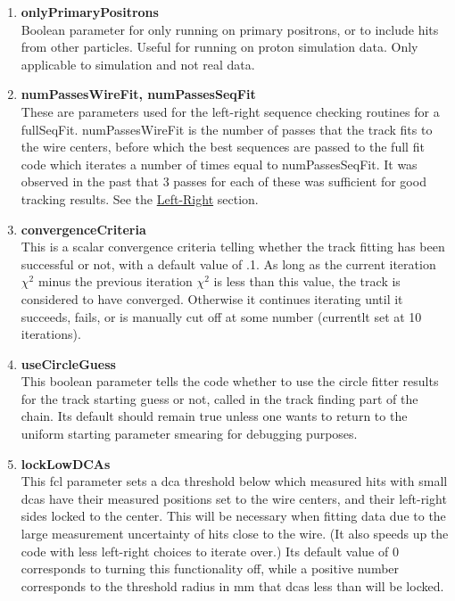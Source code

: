 \begin{enumerate}
      \item{\bf{onlyPrimaryPositrons}} \\
      Boolean parameter for only running on primary positrons, or to include hits from other particles. Useful for running on proton simulation data. Only applicable to simulation and not real data.

      \item{\bf{numPassesWireFit, numPassesSeqFit}} \\
      These are parameters used for the left-right sequence checking routines for a fullSeqFit. numPassesWireFit is the number of passes that the track fits to the wire centers, before which the best sequences are passed to the full fit code which iterates a number of times equal to numPassesSeqFit. It was observed in the past that 3 passes for each of these was sufficient for good tracking results. See the \hyperref[sec:LR]{Left-Right} section.
 
      \item{\bf{convergenceCriteria}} \\
      This is a scalar convergence criteria telling whether the track fitting has been successful or not, with a default value of .1. As long as the current iteration $\chi^{2}$ minus the previous iteration $\chi^{2}$ is less than this value, the track is considered to have converged. Otherwise it continues iterating until it succeeds, fails, or is manually cut off at some number (currentlt set at 10 iterations).

      \item{\bf{useCircleGuess}} \\
      This boolean parameter tells the code whether to use the circle fitter results for the track starting guess or not, called in the track finding part of the chain. Its default should remain true unless one wants to return to the uniform starting parameter smearing for debugging purposes.

      \item{\bf{lockLowDCAs}} \\
      This fcl parameter sets a dca threshold below which measured hits with small dcas have their measured positions set to the wire centers, and their left-right sides locked to the center. This will be necessary when fitting data due to the large measurement uncertainty of hits close to the wire. (It also speeds up the code with less left-right choices to iterate over.) Its default value of 0 corresponds to turning this functionality off, while a positive number corresponds to the threshold radius in mm that dcas less than will be locked.


\end{enumerate}
